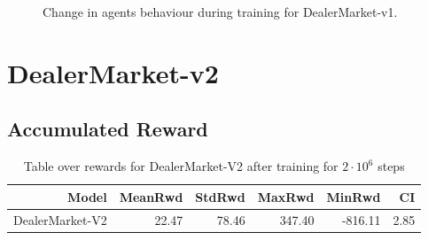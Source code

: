 \documentclass{kththesis}
\theoremstyle{definition}
\begin{document}
\begin{figure}[H]
{\label{fig:sv3}}
\caption{Change in agents behaviour during training for DealerMarket-v1.}
\label{fig:viz1}
\end{figure}

\section{DealerMarket-v2}

\subsection*{Accumulated Reward}

%		

\begin{table}[H]
\centering
\begin{tabular}{rrrrrr}
  \hline
 \textbf{Model} & \textbf{MeanRwd} & \textbf{StdRwd} & \textbf{MaxRwd} & \textbf{MinRwd} & \textbf{CI} \\ 
  \hline
DealerMarket-V2 & 22.47 & 78.46 & 347.40 & -816.11 & 2.85  \\
   \hline
\end{tabular}
\caption{Table over rewards for DealerMarket-V2 after training for $2\cdot10^6$ steps}
\label{tab:dm2}
\end{table}
\end{document}

